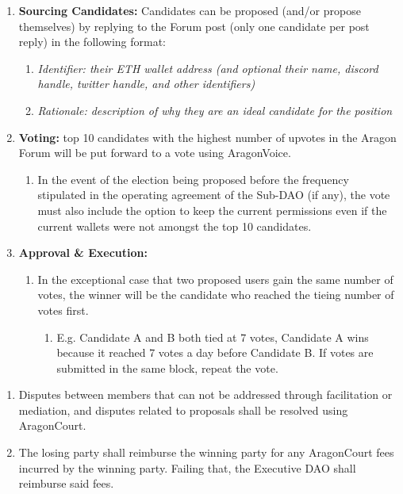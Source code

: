 \begin{enumerate}
\begin{enumerate}
\begin{enumerate}
			\item \textbf{Sourcing Candidates:} Candidates can be proposed (and/or propose themselves) by replying to the Forum post (only one candidate per post reply) in the following format:
			\begin{enumerate}
				\item \textit{Identifier: their ETH wallet address (and optional their name, discord handle, twitter handle, and other identifiers)}
				\item \textit{Rationale: description of why they are an ideal candidate for the position}
			\end{enumerate}

			\item \textbf{Voting:} top 10 candidates with the highest number of upvotes in the Aragon Forum will be put forward to a vote using \gls{AragonVoice}.
			\begin{enumerate}
				\item In the event of the election being proposed before the frequency stipulated in the operating agreement of the Sub-\ac{DAO} (if any), the vote must also include the option to keep the current permissions even if the current wallets were not amongst the top 10 candidates.
			\end{enumerate}

			\item \textbf{Approval \& Execution:}
			\begin{enumerate}
				\item In the exceptional case that two proposed users gain the same number of votes, the winner will be the candidate who reached the tieing number of votes first.
				\begin{enumerate}
					\item E.g. Candidate A and B both tied at 7 votes, Candidate A wins because it reached 7 votes a day before Candidate B.
					If votes are submitted in the same block, repeat the vote.
				\end{enumerate}
			
			\end{enumerate}
		
		\end{enumerate}
	
	\end{enumerate}
	
	\begin{enumerate}
		\item Disputes between members that can not be addressed through facilitation or mediation, and disputes related to proposals shall be resolved using \gls{AragonCourt}.
		\item The losing party shall reimburse the winning party for any \gls{AragonCourt} fees incurred by the winning party. Failing that, the Executive \ac{DAO} shall reimburse said fees.
	\end{enumerate}

\end{enumerate}